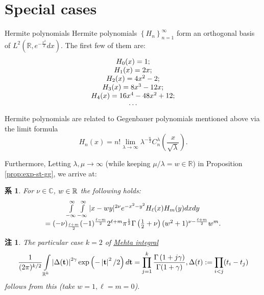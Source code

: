 \documentclass[pdf,notes]{beamer}
\newtheorem{remark}{注}
\newtheorem{cor}{系}
\begin{document}
\section{Special cases}
\begin{frame}{Hermite polynomials}
	Hermite polynomials $\left\{ H_n \right\}_{n=1}^\infty$ form an orthogonal basis of $L^2\left( \mathbb{R},e^{-\frac{x^2}{2}}dx \right)$.
	The first few of them are:\begin{equation*}
		\begin{array}[]{c}
		H_0(x)=1;\\
		H_1(x)=2x;\\
		H_2(x)=4x^2-2;\\
		H_3(x)=8x^3-12x;\\
		H_4(x)=16x^4-48x^2+12;\\
		\cdots
		\end{array}
	\end{equation*}
	Hermite polynomials are related to Gegenbauer polynomials mentioned above via the limit formula
	\begin{equation*}
			H_n (x) = n! \lim_{\lambda \rightarrow \infty} \lambda^{- \frac{n}{2}}
			C_n^{\lambda} \left( \frac{x}{\sqrt{\lambda}} \right).
	\end{equation*}
\end{frame}
\begin{frame}
	Furthermore,
	Letting $\lambda,\mu\to\infty$ (while keeping $\mu/\lambda=w\in\mathbb{R}$)
	in Proposition \ref{prop:exp-st-gg}, we arrive at:
	\begin{cor}\label{cor:int-xzy-hh}
		For $\nu\in\mathbb{C}$, $w\in\mathbb{R}$ the following holds:
		\begin{equation*}
			\begin{array}[]{c}
			\int_{- \infty}^{\infty} \int_{- \infty}^{\infty} | x - w y |^{2 \nu} e^{-
			x^2 - y^2} H_\ell (x) H_m (y) d x d y \\= (- \nu)_{\frac{\ell + m}{2}} (- 1)^{\frac{\ell
			- m}{2}} 2^{\ell + m} \pi^{\frac{1}{2}} \Gamma \left( \frac{1}{2} + \nu \right)
			(w^2 + 1)^{\nu - \frac{\ell + m}{2}} w^m .
			\end{array}
		\end{equation*}
	\end{cor}
	\pause
	\begin{remark}
		The particular case $k=2$ of \underline{Mehta integral}
	\vspace{-0.3cm}
		\begin{equation*}
			\frac{1}{(2\pi)^{k/2}}\int_{\mathbb{R}^k}\myabs{\Delta(\mathbf{t})}^{2\gamma}\exp\left( -\myabs{\mathbf{t}}^2/2 \right)d\mathbf{t}=\prod_{j=1}^k\frac{\Gamma\left( 
			1+j\gamma\right)}{\Gamma(1+\gamma)},\Delta(t):=\prod_{i<j}(t_i-t_j)
	\vspace{-0.4cm}
		\end{equation*}
		follows from this (take $w=1,\ell=m=0$).
	\end{remark}
\end{frame}
\end{document}
